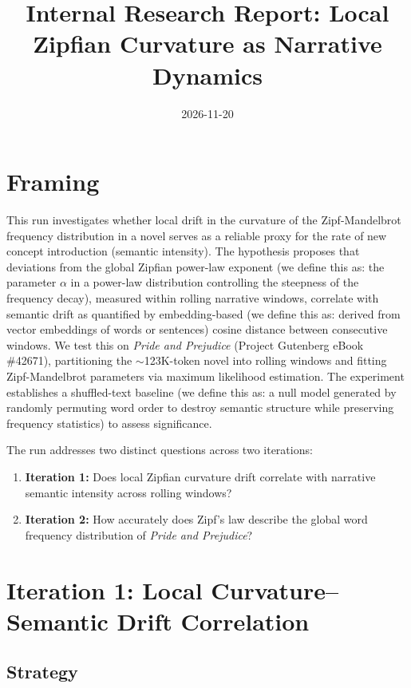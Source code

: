 \documentclass[11pt,letterpaper]{article}
\title{Internal Research Report: Local Zipfian Curvature as Narrative Dynamics}
\date{2026-11-20}
\begin{document}
\maketitle

\tableofcontents

\newpage

\section{Framing}

This run investigates whether local drift in the curvature of the Zipf-Mandelbrot frequency distribution in a novel serves as a reliable proxy for the rate of new concept introduction (semantic intensity). The hypothesis proposes that deviations from the global Zipfian power-law exponent (we define this as: the parameter $\alpha$ in a power-law distribution controlling the steepness of the frequency decay), measured within rolling narrative windows, correlate with semantic drift as quantified by embedding-based (we define this as: derived from vector embeddings of words or sentences) cosine distance between consecutive windows. We test this on \textit{Pride and Prejudice} (Project Gutenberg eBook \#42671), partitioning the $\sim$123K-token novel into rolling windows and fitting Zipf-Mandelbrot parameters via maximum likelihood estimation. The experiment establishes a shuffled-text baseline (we define this as: a null model generated by randomly permuting word order to destroy semantic structure while preserving frequency statistics) to assess significance.

The run addresses two distinct questions across two iterations:
\begin{enumerate}
\item \textbf{Iteration 1:} Does local Zipfian curvature drift correlate with narrative semantic intensity across rolling windows?
\item \textbf{Iteration 2:} How accurately does Zipf's law describe the global word frequency distribution of \textit{Pride and Prejudice}?
\end{enumerate}

\section{Iteration 1: Local Curvature--Semantic Drift Correlation}

\subsection{Strategy}
\end{document}
